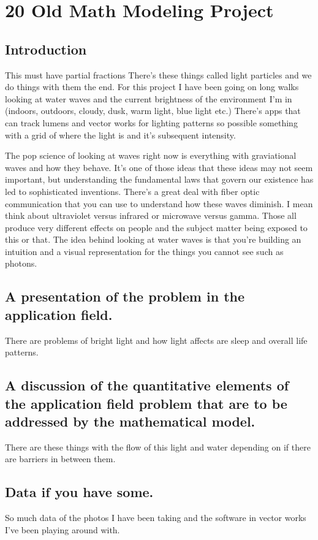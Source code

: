 \chapter{20 Old Math Modeling Project}
\section{Introduction}

This must have partial fractions
There's these things called light particles and we do things with them the end. For this project I have been going on long walks looking at water waves and the current brightness of the environment I'm in (indoors, outdoors, cloudy, dusk, warm light, blue light etc.) There's apps that can track lumens and vector works for lighting patterns so possible something with a grid of where the light is and it's subsequent intensity. 

\par 
The pop science of looking at waves right now is everything with graviational waves and how they behave. It's one of those ideas that these ideas may not seem important, but understanding the fundamental laws that govern our existence has led to sophisticated inventions. There's a great deal with fiber optic communication that you can use to understand how these waves diminish. I mean think about ultraviolet versus infrared or microwave versus gamma. Those all produce very different effects on people and the subject matter being exposed to this or that. The idea behind looking at water waves is that you're building an intuition and a visual representation for the things you cannot see such as photons. 

\section{A presentation of the problem in the application field.}

There are problems of bright light and how light affects are sleep and overall life patterns. 

\section{A discussion of the quantitative elements of the application field problem that are to be addressed by the mathematical model.}
There are these things with the flow of this light and water depending on if there are barriers in between them. 

\section{Data if you have some.} 
So much data of the photos I have been taking and the software in vector works I've been playing around with. 

